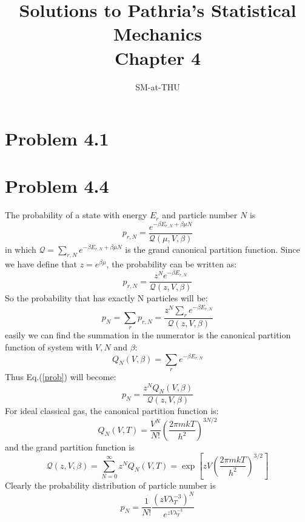 \documentclass{article}
\author{SM-at-THU}
\title{\bf{Solutions to Pathria's Statistical Mechanics}\\Chapter 4}
\begin{document}
\maketitle
\section*{Problem 4.1}

\section*{Problem 4.4}
The probability of a state with energy $E_r$ and particle number $N$ is
\begin{equation}
p_{r,N} = \frac{e^{-\beta E_{r,N}+\beta \mu N}}{\mathcal{Q}(\mu,V,\beta)}
\end{equation}
in which $\mathcal{Q} = \sum_{r,N}e^{-\beta E_{r,N}+\beta \mu N}$ is the grand canonical partition function. Since we have define that $z = e^{\beta\mu}$, the probability can be written as:
\begin{equation}
p_{r,N} = \frac{z^N e^{-\beta E_{r,N}}}{\mathcal{Q}(z,V,\beta)}
\end{equation}
So the probability that has exactly N particles will be:
\begin{equation}\label{prob}
p_N = \sum_r p_{r,N} = \frac{z^N\sum_{r}e^{-\beta E_{r,N}}}{\mathcal{Q}(z,V,\beta)}
\end{equation}
easily we can find the summation in the numerator is the canonical partition function of system with $V,N$ and $\beta$:
\begin{equation}
Q_N(V,\beta) = \sum_{r}e^{-\beta E_{r,N}}
\end{equation}
Thus Eq.(\ref{prob}) will become: 
\begin{equation}
p_N = \frac{z^N Q_N(V,\beta)}{\mathcal{Q}(z,V,\beta)}
\end{equation}
For ideal classical gas, the canonical partition function is:
\begin{equation}
Q_N(V,T) = \frac{V^N}{N!}\left(\frac{2\pi mkT}{h^2}\right)^{3N/2}
\end{equation}
and the grand partition function is
\begin{equation}
\mathcal{Q}(z,V,\beta) = \sum_{N = 0}^\infty z^N Q_N(V,T) = \exp\left[zV\left(\frac{2\pi mkT}{h^2}\right)^{3/2}\right]
\end{equation}
Clearly the probability distribution of particle number is
\begin{equation}
p_N = \frac{1}{N!}\frac{(zV\lambda_T^{-3})^N}{e^{zV\lambda_T^{-3}}}
\end{equation}
\end{document}
